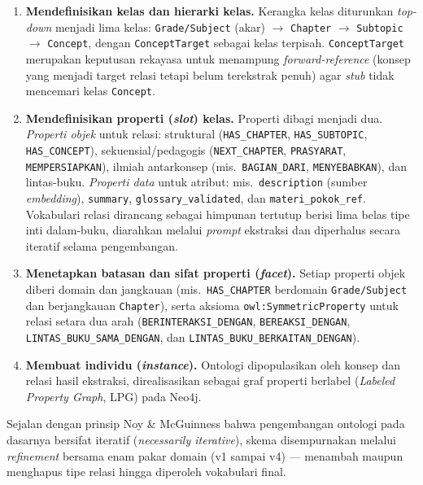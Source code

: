 \documentclass[../../thesis]{subfiles}
\begin{document}
\begin{enumerate}
  \item \textbf{Mendefinisikan kelas dan hierarki kelas.} Kerangka kelas
        diturunkan \textit{top-down} menjadi lima kelas: \texttt{Grade/Subject}
        (akar) $\rightarrow$ \texttt{Chapter} $\rightarrow$ \texttt{Subtopic}
        $\rightarrow$ \texttt{Concept}, dengan \texttt{ConceptTarget} sebagai
        kelas terpisah. \texttt{ConceptTarget} merupakan keputusan rekayasa
        untuk menampung \textit{forward-reference} (konsep yang menjadi target
        relasi tetapi belum terekstrak penuh) agar \textit{stub} tidak mencemari
        kelas \texttt{Concept}.

  \item \textbf{Mendefinisikan properti (\textit{slot}) kelas.} Properti dibagi menjadi
        dua. \emph{Properti objek} untuk relasi: struktural
        (\texttt{HAS\_CHAPTER}, \texttt{HAS\_SUBTOPIC}, \texttt{HAS\_CONCEPT}),
        sekuensial/pedagogis (\texttt{NEXT\_CHAPTER}, \texttt{PRASYARAT},
        \texttt{MEMPERSIAPKAN}), ilmiah antarkonsep (mis.\ \texttt{BAGIAN\_DARI},
        \texttt{MENYEBABKAN}), dan lintas-buku. \emph{Properti data} untuk
        atribut: mis.\ \texttt{description} (sumber \textit{embedding}),
        \texttt{summary}, \texttt{glossary\_validated}, dan
        \texttt{materi\_pokok\_ref}. Vokabulari relasi dirancang sebagai
        himpunan tertutup berisi lima belas tipe inti dalam-buku, diarahkan
        melalui \textit{prompt} ekstraksi dan diperhalus secara iteratif selama
        pengembangan.

  \item \textbf{Menetapkan batasan dan sifat properti (\textit{facet}).} Setiap properti objek
        diberi domain dan jangkauan (mis.\ \texttt{HAS\_CHAPTER} berdomain
        \texttt{Grade/Subject} dan berjangkauan \texttt{Chapter}), serta aksioma
        \texttt{owl:SymmetricProperty} untuk relasi setara dua arah
        (\texttt{BERINTERAKSI\_DENGAN}, \texttt{BEREAKSI\_DENGAN},
        \texttt{LINTAS\_BUKU\_SAMA\_DENGAN}, dan
        \texttt{LINTAS\_BUKU\_BERKAITAN\_DENGAN}).

  \item \textbf{Membuat individu (\textit{instance}).} Ontologi dipopulasikan oleh konsep dan relasi
        hasil ekstraksi, direalisasikan sebagai graf properti berlabel
        (\textit{Labeled Property Graph}, LPG) pada Neo4j.
\end{enumerate}

Sejalan dengan prinsip Noy \& McGuinness bahwa pengembangan ontologi pada
dasarnya bersifat iteratif (\textit{necessarily iterative}), skema disempurnakan
melalui \textit{refinement} bersama enam pakar domain (v1 sampai v4) ---
menambah maupun menghapus tipe relasi hingga diperoleh vokabulari final.
\end{document}
